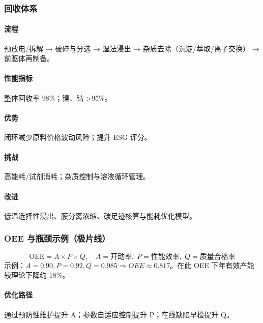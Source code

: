 \subsubsection{回收体系}
\paragraph{流程} 预放电/拆解 → 破碎与分选 → 湿法浸出 → 杂质去除（沉淀/萃取/离子交换） → 前驱体再制备。\paragraph{性能指标} 整体回收率 98\%；镍、钴 >95\%。\paragraph{优势} 闭环减少原料价格波动风险；提升 ESG 评分。\paragraph{挑战} 高能耗/试剂消耗；杂质控制与溶液循环管理。\paragraph{改进} 低温选择性浸出、膜分离浓缩、碳足迹核算与能耗优化模型。

\subsubsection{OEE 与瓶颈示例（极片线）}
\[\text{OEE} = A \times P \times Q,\quad A=\text{开动率},\; P=\text{性能效率},\; Q=\text{质量合格率}\]
示例：\(A=0.90, P=0.92, Q=0.985 \Rightarrow OEE \approx 0.817\)。在此 OEE 下年有效产能较理论下降约 18\%。
\paragraph{优化路径} 通过预防性维护提升 A；参数自适应控制提升 P；在线缺陷早检提升 Q。

